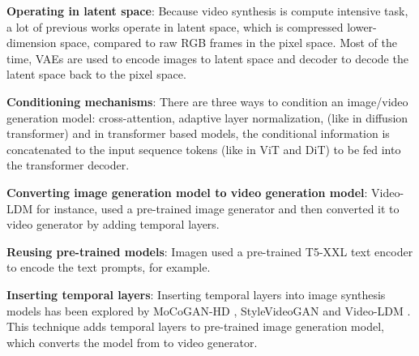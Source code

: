 \textbf{Operating in latent space}: Because video synthesis is compute intensive task, a lot of previous works operate in latent space, which is compressed lower-dimension space, compared to raw RGB frames in the pixel space. Most of the time, VAEs are used to encode images to latent space and decoder to decode the latent space back to the pixel space.

\textbf{Conditioning mechanisms}: There are three ways to condition an image/video generation model: cross-attention, adaptive layer normalization, (like in diffusion transformer) and in transformer based models, the conditional information is concatenated to the input sequence tokens (like in ViT and DiT) to be fed into the transformer decoder.

\textbf{Converting image generation model to video generation model}: Video-LDM \cite{video_ldm} for instance, used a pre-trained image generator and then converted it to video generator by adding temporal layers.

\textbf{Reusing pre-trained models}: Imagen \cite{imagen} used a pre-trained T5-XXL text encoder to encode the text prompts, for example.

\textbf{Inserting temporal layers}: Inserting temporal layers into image synthesis models has been explored by MoCoGAN-HD \cite{mocogan_hd}, StyleVideoGAN \cite{style_video_gan} and Video-LDM \cite{video_ldm}. This technique adds temporal layers to pre-trained image generation model, which converts the model from to video generator.
